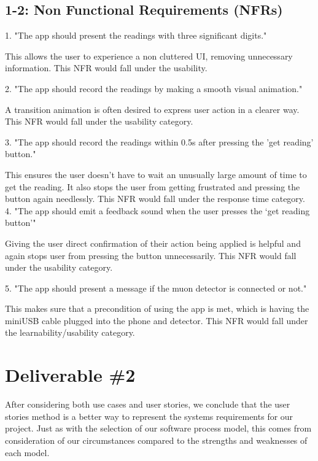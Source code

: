 \documentclass[11pt,a4paper]{article}
\begin{document}
\subsection*{1-2: Non Functional Requirements (NFRs)}

1. "The app should present the readings with three significant digits."

This allows the user to experience a non cluttered UI, removing unnecessary information. This NFR would fall under the usability. 

\vskip 4mm

2. "The app should record the readings by making a smooth visual animation."

A transition animation is often desired to express user action in a clearer way. This NFR would fall under the usability category. 

\vskip 4mm

3. "The app should record the readings within 0.5s after pressing the 'get reading' button."

This ensures the user doesn't have to wait an unusually large amount of time to get the reading. It also stops the user from getting frustrated and pressing the button again needlessly. This NFR would fall under the response time category. 
\vskip 4mm
4. "The app should emit a feedback sound when the user presses the ‘get reading button’" 

Giving the user direct confirmation of their action being applied is helpful and again stops user from pressing the button unnecessarily. This NFR would fall under the usability category.

\vskip 4mm
5. "The app should present a message if the muon detector is connected or not."

This makes sure that a precondition of using the app is met, which is having the miniUSB cable plugged into the phone and detector. This NFR would fall under the learnability/usability category.



\newpage 
\section*{Deliverable \#2}

After considering both use cases and user stories, we conclude that the user stories method is a better way to represent the systems requirements for our project. Just as with the selection of our software process model, this comes from consideration of our circumstances compared to the strengths and weaknesses of each model.
\end{document}

